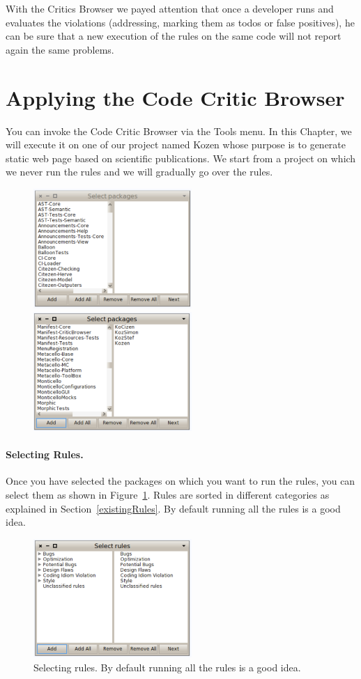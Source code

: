 \documentclass[a4paper,10pt,twoside]{book}
\begin{document}
With the Critics Browser we payed attention that once a developer runs and evaluates the violations (\ie addressing, marking them as todos or false positives), he can be sure that a new execution of the rules on the same code will not report again the same problems. 



\section{Applying the Code Critic Browser}

You can invoke the Code Critic Browser via the Tools menu. In this Chapter, we will execute it on one of our project named Kozen whose purpose is to generate static web page based on scientific publications. We start from a project on which we never run the rules and we will gradually go over the rules.
\begin{figure}[h]
\centering
\includegraphics[width=6cm]{selectingPackage}\includegraphics[width=6cm]{selectingPackage2} 
\end{figure}


\paragraph{Selecting Rules.}
Once you have selected the packages on which you want to run the rules, you can select them as shown in Figure~\ref{ruleselection}. Rules are sorted in different categories as explained in Section~\ref{existingRules}. By default running all the rules is a good idea.


\begin{figure}[h]
\centering
\includegraphics[width=6cm]{selectingRules}
\caption{Selecting rules. By default running all the rules is a good idea. \label{ruleselection}}
\end{figure}
\end{document}
